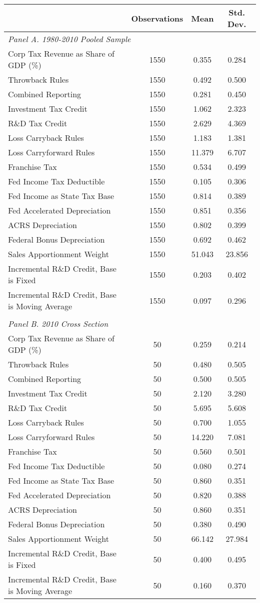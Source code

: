\begin{tabular}{l*{3}{c}}
\hline
\hline
 & Observations & Mean & Std. Dev.\\
\hline
\multicolumn{4}{l}{\textit{Panel A. 1980-2010 Pooled Sample}}\\
Corp Tax Revenue as Share of GDP (\%)&1550&0.355&0.284\\
Throwback Rules&1550&0.492&0.500\\
Combined Reporting&1550&0.281&0.450\\
Investment Tax Credit&1550&1.062&2.323\\
R\&D Tax Credit&1550&2.629&4.369\\
Loss Carryback Rules&1550&1.183&1.381\\
Loss Carryforward Rules&1550&11.379&6.707\\
Franchise Tax&1550&0.534&0.499\\
Fed Income Tax Deductible&1550&0.105&0.306\\
Fed Income as State Tax Base&1550&0.814&0.389\\
Fed Accelerated Depreciation&1550&0.851&0.356\\
ACRS Depreciation&1550&0.802&0.399\\
Federal Bonus Depreciation&1550&0.692&0.462\\
Sales Apportionment Weight&1550&51.043&23.856\\
Incremental R\&D Credit, Base is Fixed&1550&0.203&0.402\\
Incremental R\&D Credit, Base is Moving Average&1550&0.097&0.296\\
&&&\\
\multicolumn{4}{l}{\textit{Panel B. 2010 Cross Section}}\\
Corp Tax Revenue as Share of GDP (\%)&50&0.259&0.214\\
Throwback Rules&50&0.480&0.505\\
Combined Reporting&50&0.500&0.505\\
Investment Tax Credit&50&2.120&3.280\\
R\&D Tax Credit&50&5.695&5.608\\
Loss Carryback Rules&50&0.700&1.055\\
Loss Carryforward Rules&50&14.220&7.081\\
Franchise Tax&50&0.560&0.501\\
Fed Income Tax Deductible&50&0.080&0.274\\
Fed Income as State Tax Base&50&0.860&0.351\\
Fed Accelerated Depreciation&50&0.820&0.388\\
ACRS Depreciation&50&0.860&0.351\\
Federal Bonus Depreciation&50&0.380&0.490\\
Sales Apportionment Weight&50&66.142&27.984\\
Incremental R\&D Credit, Base is Fixed&50&0.400&0.495\\
Incremental R\&D Credit, Base is Moving Average&50&0.160&0.370\\
\hline
\hline
\end{tabular}
